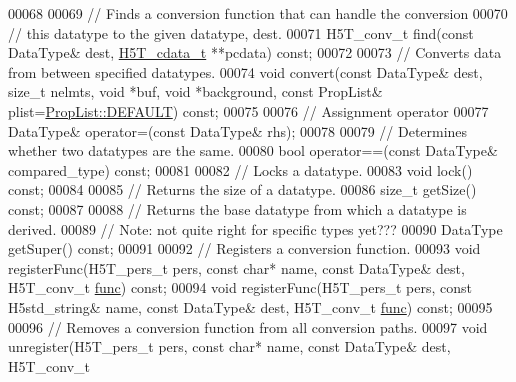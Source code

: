 \begin{DoxyCode}
00068 
00069         \textcolor{comment}{// Finds a conversion function that can handle the conversion}
00070         \textcolor{comment}{// this datatype to the given datatype, dest.}
00071         H5T\_conv\_t find(\textcolor{keyword}{const} DataType& dest, \hyperlink{struct_h5_t__cdata__t}{H5T\_cdata\_t} **pcdata) \textcolor{keyword}{const};
00072 
00073         \textcolor{comment}{// Converts data from between specified datatypes.}
00074         \textcolor{keywordtype}{void} convert(\textcolor{keyword}{const} DataType& dest, \textcolor{keywordtype}{size\_t} nelmts, \textcolor{keywordtype}{void} *buf, \textcolor{keywordtype}{void} *background, \textcolor{keyword}{const} PropList& 
      plist=\hyperlink{class_h5_1_1_prop_list_ae52af66ce82af0ea7e6dc57148c56241}{PropList::DEFAULT}) \textcolor{keyword}{const};
00075 
00076         \textcolor{comment}{// Assignment operator}
00077         DataType& operator=(\textcolor{keyword}{const} DataType& rhs);
00078 
00079         \textcolor{comment}{// Determines whether two datatypes are the same.}
00080         \textcolor{keywordtype}{bool} operator==(\textcolor{keyword}{const} DataType& compared\_type) \textcolor{keyword}{const};
00081 
00082         \textcolor{comment}{// Locks a datatype.}
00083         \textcolor{keywordtype}{void} lock() \textcolor{keyword}{const};
00084 
00085         \textcolor{comment}{// Returns the size of a datatype.}
00086         \textcolor{keywordtype}{size\_t} getSize() \textcolor{keyword}{const};
00087 
00088         \textcolor{comment}{// Returns the base datatype from which a datatype is derived.}
00089         \textcolor{comment}{// Note: not quite right for specific types yet???}
00090         DataType getSuper() \textcolor{keyword}{const};
00091 
00092         \textcolor{comment}{// Registers a conversion function.}
00093         \textcolor{keywordtype}{void} registerFunc(H5T\_pers\_t pers, \textcolor{keyword}{const} \textcolor{keywordtype}{char}* name, \textcolor{keyword}{const} DataType& dest, H5T\_conv\_t 
      \hyperlink{structfunc}{func}) \textcolor{keyword}{const};
00094         \textcolor{keywordtype}{void} registerFunc(H5T\_pers\_t pers, \textcolor{keyword}{const} H5std\_string& name, \textcolor{keyword}{const} DataType& dest, H5T\_conv\_t 
      \hyperlink{structfunc}{func}) \textcolor{keyword}{const};
00095 
00096         \textcolor{comment}{// Removes a conversion function from all conversion paths.}
00097         \textcolor{keywordtype}{void} unregister(H5T\_pers\_t pers, \textcolor{keyword}{const} \textcolor{keywordtype}{char}* name, \textcolor{keyword}{const} DataType& dest, H5T\_conv\_t 

\end{DoxyCode}
